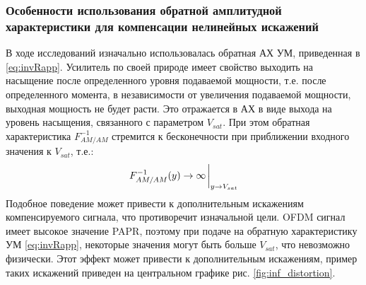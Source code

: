 \subsubsection{Особенности использования обратной амплитудной
характеристики для компенсации нелинейных искажений}
В ходе исследований изначально использовалась обратная АХ УМ, приведенная в
\ref{eq:invRapp}. Усилитель по своей природе имеет свойство выходить на
насыщение после определенного уровня подаваемой мощности, т.е. после
определенного момента, в независимости от увеличения подаваемой мощности,
выходная мощность не будет расти. Это отражается в АХ в виде выхода на
уровень насыщения, связанного с параметром $V_{sat}$. При этом обратная
характеристика $F^{-1}_{AM/AM}$ стремится к бесконечности при приближении
входного значения к $V_{sat}$, т.е.:
\begin{equation}
    F^{-1}_{AM/AM}(y) \rightarrow \infty \eval_{y \rightarrow V_{sat}}
\end{equation}
Подобное поведение может привести к дополнительным искажениям
компенсируемого сигнала, что противоречит изначальной цели. OFDM сигнал
имеет высокое значение PAPR, поэтому при подаче на обратную характеристику
УМ \ref{eq:invRapp}, некоторые значения могут быть больше $V_{sat}$, что
невозможно физически. Этот эффект может привести к дополнительным
искажениям, пример таких искажений приведен на центральном графике рис.
\ref{fig:inf_distortion}.

